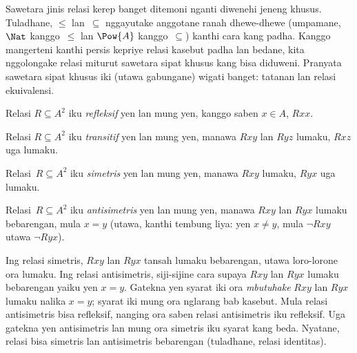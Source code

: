 \documentclass[../../../include/open-logic-section]{subfiles}
\begin{document}

\begin{intro}
Sawetara jinis relasi kerep banget ditemoni nganti diwenehi
jeneng khusus. Tuladhane, $\le$ lan~$\subseteq$
nggayutake anggotane ranah dhewe-dhewe
(umpamane, $\Nat$ kanggo~$\le$ lan
$\Pow{A}$ kanggo~$\subseteq$) kanthi cara kang padha.
Kanggo mangerteni kanthi persis kepriye relasi kasebut
padha lan bedane, kita nggolongake relasi
miturut sawetara sipat khusus kang bisa diduweni.
Pranyata sawetara sipat khusus iki (utawa gabungane)
wigati banget: tatanan lan relasi ekuivalensi.
\end{intro}

\begin{defn}[Refleksivitas]
Relasi $R \subseteq A^2$ iku \emph{refleksif} yen lan mung yen,
kanggo saben $x \in A$, $Rxx$.
\end{defn}

\begin{defn}[Transitivitas]
Relasi $R \subseteq A^2$ iku \emph{transitif} yen lan mung yen,
manawa $Rxy$ lan $Ryz$ lumaku, $Rxz$ uga lumaku.
\end{defn}

\begin{defn}[Simetri]
Relasi~$R \subseteq A^2$ iku \emph{simetris} yen lan mung yen,
manawa $Rxy$ lumaku, $Ryx$ uga lumaku.
\end{defn}

\begin{defn}[Antisimetri]
Relasi~$R \subseteq A^2$ iku \emph{antisimetris} yen lan mung yen,
manawa $Rxy$ lan $Ryx$ lumaku bebarengan, mula $x=y$
(utawa, kanthi tembung liya: yen $x\neq y$,
mula $\lnot Rxy$ utawa $\lnot Ryx$).
\end{defn}

\begin{explain}
Ing relasi simetris, $Rxy$ lan $Ryx$ tansah lumaku
bebarengan, utawa loro-lorone ora lumaku.
Ing relasi antisimetris, siji-sijine cara supaya $Rxy$
lan $Ryx$ lumaku bebarengan yaiku yen $x = y$.
Gatekna yen syarat iki ora \emph{mbutuhake} $Rxy$ lan $Ryx$
lumaku nalika $x = y$; syarat iki mung ora nglarang bab kasebut.
Mula relasi antisimetris bisa refleksif, nanging ora
saben relasi antisimetris iku refleksif.
Uga gatekna yen antisimetris lan mung ora simetris iku
syarat kang beda. Nyatane, relasi bisa simetris lan
antisimetris bebarengan (tuladhane, relasi identitas).
\end{explain}
\end{document}
